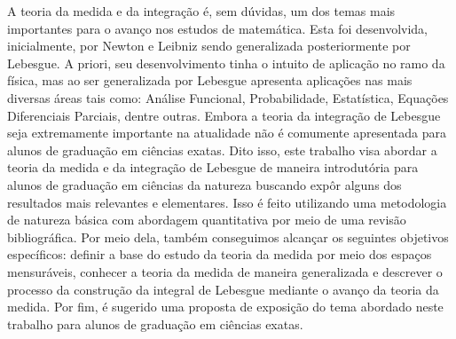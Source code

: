 A teoria da medida e da integração é, sem dúvidas, um dos temas mais importantes para o avanço nos estudos de matemática.
Esta foi desenvolvida, inicialmente, por Newton e Leibniz sendo generalizada posteriormente por Lebesgue.
A priori, seu desenvolvimento tinha o intuito de aplicação no ramo da física, mas ao ser generalizada por Lebesgue apresenta aplicações nas mais diversas áreas tais como: Análise Funcional, Probabilidade, Estatística, Equações Diferenciais Parciais, dentre outras. 
Embora a teoria da integração de Lebesgue seja extremamente importante na atualidade não é comumente apresentada para alunos de graduação em ciências exatas.
Dito isso, este trabalho visa abordar a teoria da medida e da integração de Lebesgue de maneira introdutória para alunos de graduação em ciências da natureza buscando expôr alguns dos resultados mais relevantes e elementares.
Isso é feito utilizando uma metodologia de natureza básica com abordagem quantitativa por meio de uma revisão bibliográfica.
Por meio dela, também conseguimos alcançar os seguintes objetivos específicos: definir a base do estudo da teoria da medida por meio dos espaços mensuráveis,
conhecer a teoria da medida de maneira generalizada e descrever o processo da construção da integral de Lebesgue mediante o avanço da teoria da medida.
Por fim, é sugerido uma proposta de exposição do tema abordado neste trabalho para alunos de graduação em ciências exatas.

